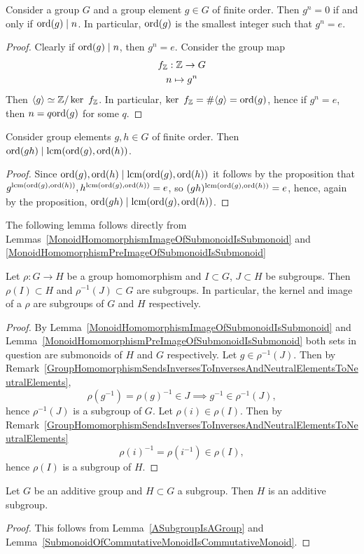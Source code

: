 \begin{proposition}
    Consider a group $G$ and a group element $g\in G$ of finite order. Then $g^n=0$ if and only if $\mathrm{ord}(g)\mid n$. In particular, $\mathrm{ord}(g)$ is the smallest integer such that $g^n=e$. 
\end{proposition}
\begin{proof}
    Clearly if $\mathrm{ord}(g)\mid n$, then $g^n =e$. Consider the group map 
    \begin{gather*}
        f_{\mathbb{Z}} : \mathbb{Z} \rightarrow G\\
        n\mapsto g^n
    \end{gather*}
    Then $\langle g\rangle \simeq \mathbb{Z}/\ker\ f_{\mathbb{Z}}$. In particular, $\ker\ f_{\mathbb{Z}} = \#\langle g\rangle = \mathrm{ord}(g)$, hence if $g^n=e$, then $n=q\mathrm{ord}(g)$ for some $q$.
\end{proof}
\begin{corollary}
    Consider group elements $g,h\in G$ of finite order. Then $\mathrm{ord}(gh)\mid \mathrm{lcm}(\mathrm{ord}(g),\mathrm{ord}(h))$.
\end{corollary}
\begin{proof}
    Since $\mathrm{ord}(g),\mathrm{ord}(h)\mid \mathrm{lcm}(\mathrm{ord}(g),\mathrm{ord}(h))$ it follows by the proposition that $g^{\mathrm{lcm}(\mathrm{ord}(g),\mathrm{ord}(h))}, h^{\mathrm{lcm}(\mathrm{ord}(g),\mathrm{ord}(h))}=e$, so $(gh)^{\mathrm{lcm}(\mathrm{ord}(g),\mathrm{ord}(h))}=e$, hence, again by the proposition, $ \mathrm{ord}(gh)\mid \mathrm{lcm}(\mathrm{ord}(g),\mathrm{ord}(h))$.
\end{proof}
The following lemma follows directly from Lemmas~\ref{MonoidHomomorphismImageOfSubmonoidIsSubmonoid} and \ref{MonoidHomomorphismPreImageOfSubmonoidIsSubmonoid}
\begin{lemma}\label{KernelAndImageOfGroupHomomorphismIsSubgroup}
    Let $\rho : G\rightarrow H$ be a group homomorphism and $I\subset G$, $J\subset H$ be subgroups. Then $\rho(I)\subset H$ and $\rho^{-1}(J)\subset G$ are subgroups. In particular, the kernel and image of a $\rho$ are subgroups of $G$ and $H$ respectively. 
\end{lemma}
\begin{proof}
    By Lemma~\ref{MonoidHomomorphismImageOfSubmonoidIsSubmonoid} and Lemma~\ref{MonoidHomomorphismPreImageOfSubmonoidIsSubmonoid} both sets in question are submonoids of $H$ and $G$ respectively. Let $g\in \rho^{-1}(J)$. Then by Remark~\ref{GroupHomomorphismSendsInversesToInversesAndNeutralElementsToNeutralElements},
    $$\rho\left(g^{-1}\right)  = \rho(g)^{-1} \in J \implies g^{-1}\in \rho^{-1}(J),$$
    hence $\rho^{-1}(J)$ is a subgroup of $G$. Let $\rho(i)\in \rho(I)$. Then by Remark~\ref{GroupHomomorphismSendsInversesToInversesAndNeutralElementsToNeutralElements}
    $$\rho(i)^{-1}=\rho\left(i^{-1}\right) \in \rho(I),$$
    hence $\rho(I)$ is a subgroup of $H$.
\end{proof}
\begin{proposition}
    Let $G$ be an additive group and $H\subset G$ a subgroup. Then $H$ is an additive subgroup.
\end{proposition}
\begin{proof}
    This follows from Lemma~\ref{ASubgroupIsAGroup} and Lemma~\ref{SubmonoidOfCommutativeMonoidIsCommutativeMonoid}.
\end{proof}
